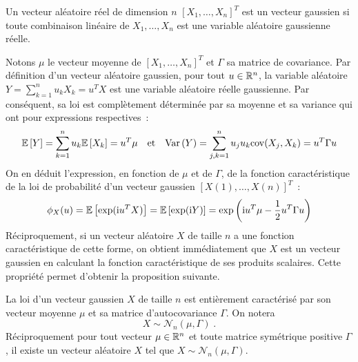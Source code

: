 \begin{definition}
  Un vecteur al\'eatoire r\'eel de dimension $n$
  $[X_1,\dots,X_n]^T$
  est un vecteur gaussien si toute combinaison
  lin\'eaire de $X_1,\dots,X_n$ est une variable al\'eatoire gaussienne
  r\'eelle.
\end{definition}
Notons $\mu$ le vecteur moyenne de $[X_1,\dots,X_n]^T$ et $\Gamma$ sa
matrice de covariance. Par d\'efinition d'un vecteur al\'eatoire gaussien,
pour tout $u\in\mathbb{R}^n$, la variable al\'eatoire $Y = \sum_{k=1}^n u_k
X_k=u^TX$ est une variable al\'eatoire r\'eelle gaussienne. Par
cons\'equent, sa loi est compl\`etement d\'etermin\'ee par sa moyenne et sa
variance qui ont pour expressions respectives~:
\[
 {\mathbb E}\left[  Y  \right]= \sum_{k=1}^n u_k {\mathbb E}\left[ X_k \right]=u^T\mu
 \quad \mbox {et} \quad
 \mathrm{Var}\left( Y \right)= \sum_{j,k=1}^n u_j u_k \mathrm{cov}(X_j,X_k)=u^T \Gamma u
\]
On en d\'eduit l'expression, en fonction de $\mu$ et de $\Gamma$, de
la fonction caract\'eristique de la loi de probabilit\'e d'un vecteur
gaussien $[X(1),\dots,X(n)]^T$~:
 \begin{equation}
 \label{eq:fcarac_vectgaussien}
 \phi_X(u)={\mathbb E}\left[  \exp( \mathrm{i} u^T X)  \right]={\mathbb E}\left[  \exp( \mathrm{i} Y)  \right]
 =
 \exp \left ( \mathrm{i} u^T \mu - \frac{1}{2}u^T \Gamma u
 \right)
\end{equation}
R\'eciproquement, si un vecteur al\'eatoire $X$ de taille $n$ a une fonction caract\'eristique de
cette forme, on obtient imm\'ediatement que $X$ est un vecteur gaussien en
calculant la fonction caract\'eristique de ses produits scalaires.
Cette propri\'et\'e permet d'obtenir la proposition suivante.
 \begin{proposition}\label{prop:vect_gaussiens}
   La loi d'un vecteur gaussien $X$ de taille $n$ est enti\`erement caract\'eris\'e par son vecteur
   moyenne $\mu$ et sa matrice d'autocovariance $\Gamma$. On notera
$$
X\sim\mathcal{N}_n( \mu, \Gamma) \;.
$$
R\'eciproquement pour tout vecteur
   $\mu\in\mathbb{R}^n$ et toute matrice sym\'etrique positive $\Gamma$, il existe un
   vecteur al\'eatoire $X$ tel que $X\sim\mathcal{N}_n( \mu, \Gamma)$.
 \end{proposition}
